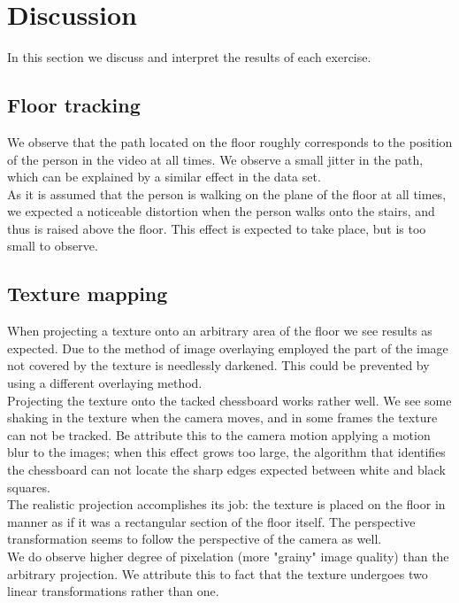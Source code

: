 \section{Discussion}
	In this section we discuss and interpret the results of each exercise.
	\subsection{Floor tracking}
	We observe that the path located on the floor roughly corresponds to the position of the person in the video at all times. We observe a small jitter in the path, which can be explained by a similar effect in the data set.\\
	As it is assumed that the person is walking on the plane of the floor at all times, we expected a noticeable distortion when the person walks onto the stairs, and thus is raised above the floor. This effect is expected to take place, but is too small to observe. 
	\subsection{Texture mapping}
	When projecting a texture onto an arbitrary area of the floor we see results as expected. Due to the method of image overlaying employed the part of the image not covered by the texture is needlessly darkened. This could be prevented by using a different overlaying method.\\
	Projecting the texture onto the tacked chessboard works rather well. We see some shaking in the texture when the camera moves, and in some frames the texture can not be tracked. Be attribute this to the camera motion applying a motion blur to the images; when this effect grows too large, the algorithm that identifies the chessboard can not locate the sharp edges expected between white and black squares. \\
	The realistic projection accomplishes its job: the texture is placed on the floor in manner as if it was a rectangular section of the floor itself. The perspective transformation seems to follow the perspective of the camera as well.\\
	We do observe higher degree of pixelation (more "grainy" image quality) than the arbitrary projection. We attribute this to fact that the texture undergoes two linear transformations rather than one. 
